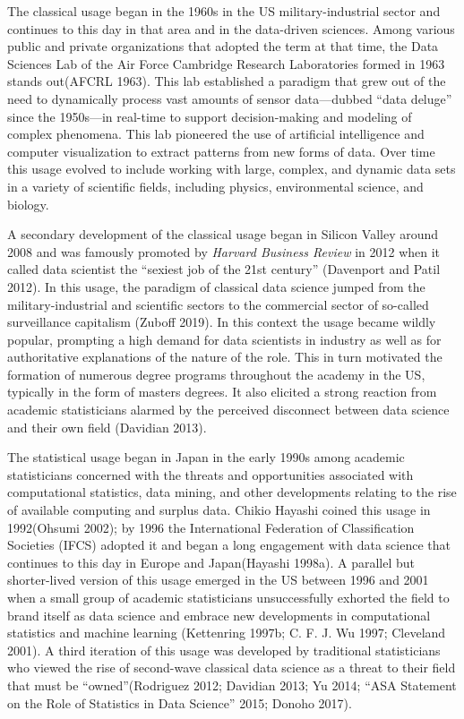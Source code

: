 \documentclass[
  letterpaper,
]{report}
\begin{document}
The classical usage began in the 1960s in the US military-industrial
sector and continues to this day in that area and in the data-driven
sciences. Among various public and private organizations that adopted
the term at that time, the Data Sciences Lab of the Air Force Cambridge
Research Laboratories formed in 1963 stands out(AFCRL 1963). This lab
established a paradigm that grew out of the need to dynamically process
vast amounts of sensor data---dubbed ``data deluge'' since the
1950s---in real-time to support decision-making and modeling of complex
phenomena. This lab pioneered the use of artificial intelligence and
computer visualization to extract patterns from new forms of data. Over
time this usage evolved to include working with large, complex, and
dynamic data sets in a variety of scientific fields, including physics,
environmental science, and biology.

A secondary development of the classical usage began in Silicon Valley
around 2008 and was famously promoted by \emph{Harvard Business Review}
in 2012 when it called data scientist the ``sexiest job of the 21st
century'' (Davenport and Patil 2012). In this usage, the paradigm of
classical data science jumped from the military-industrial and
scientific sectors to the commercial sector of so-called surveillance
capitalism (Zuboff 2019). In this context the usage became wildly
popular, prompting a high demand for data scientists in industry as well
as for authoritative explanations of the nature of the role. This in
turn motivated the formation of numerous degree programs throughout the
academy in the US, typically in the form of masters degrees. It also
elicited a strong reaction from academic statisticians alarmed by the
perceived disconnect between data science and their own field (Davidian
2013).

The statistical usage began in Japan in the early 1990s among academic
statisticians concerned with the threats and opportunities associated
with computational statistics, data mining, and other developments
relating to the rise of available computing and surplus data. Chikio
Hayashi coined this usage in 1992(Ohsumi 2002); by 1996 the
International Federation of Classification Societies (IFCS) adopted it
and began a long engagement with data science that continues to this day
in Europe and Japan(Hayashi 1998a). A parallel but shorter-lived version
of this usage emerged in the US between 1996 and 2001 when a small group
of academic statisticians unsuccessfully exhorted the field to brand
itself as data science and embrace new developments in computational
statistics and machine learning (Kettenring 1997b; C. F. J. Wu 1997;
Cleveland 2001). A third iteration of this usage was developed by
traditional statisticians who viewed the rise of second-wave classical
data science as a threat to their field that must be ``owned''(Rodriguez
2012; Davidian 2013; Yu 2014; {``ASA Statement on the Role of Statistics
in Data Science''} 2015; Donoho 2017).
\end{document}
